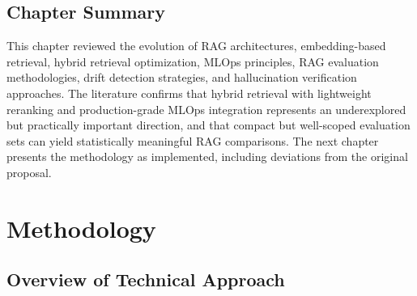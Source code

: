 \documentclass[12pt,a4paper]{report}
\begin{document}
\begin{table}[H]
\caption{Comparison of Related Work and Positioning of TechPulse.}
\label{tab:related_work}
\centering
{}
\end{table}

\section{Chapter Summary}

This chapter reviewed the evolution of RAG architectures, embedding-based retrieval, hybrid retrieval optimization, MLOps principles, RAG evaluation methodologies, drift detection strategies, and hallucination verification approaches. The literature confirms that hybrid retrieval with lightweight reranking and production-grade MLOps integration represents an underexplored but practically important direction, and that compact but well-scoped evaluation sets can yield statistically meaningful RAG comparisons. The next chapter presents the methodology as implemented, including deviations from the original proposal.

\chapter{Methodology}

\section{Overview of Technical Approach}
\label{sec:method_overview}
\end{document}
